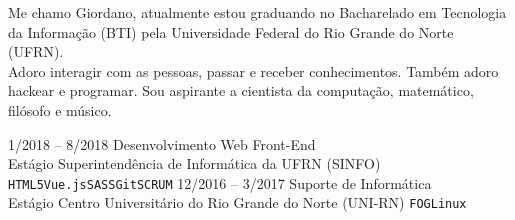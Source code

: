 \documentclass[9pt]{developercv} %
\begin{document}
\vspace{0.5cm}



\begin{minipage}[t]{0.4\textwidth} %
    \vspace{-\baselineskip} %
    Me chamo Giordano, atualmente estou gradu\-ando no Bacharelado em Tecnologia da Informação (BTI) pela Universidade Federal do Rio Grande do Norte (UFRN).\\
    Adoro interagir com as pessoas, passar e receber conhecimentos. Também adoro hackear e programar. Sou aspirante a cientista da computação, matemático, filósofo e músico.\\
\end{minipage}
\hfill %
\begin{minipage}[t]{0.5\textwidth} %
    \vspace{-\baselineskip} %
    \begin{barchart}{5.5}
    \end{barchart}
\end{minipage}




\begin{entrylist}
    \entry
        {1/2018 -- 8/2018}
        {Desenvolvimento Web Front-End\\
            \footnotesize{Estágio}}
        {Superintendência de Informática da UFRN (SINFO)}
        {\texttt{HTML5}\slashsep\texttt{Vue.js}\slashsep\texttt{SASS}\slashsep\texttt{Git}\slashsep\texttt{SCRUM}}
    \entry
        {12/2016 -- 3/2017}
        {Suporte de Informática\\
            \footnotesize{Estágio}}
        {Centro Universitário do Rio Grande do Norte (UNI-RN)}
        {\texttt{FOG}\slashsep\texttt{Linux}}
\end{entrylist}
\end{document}
